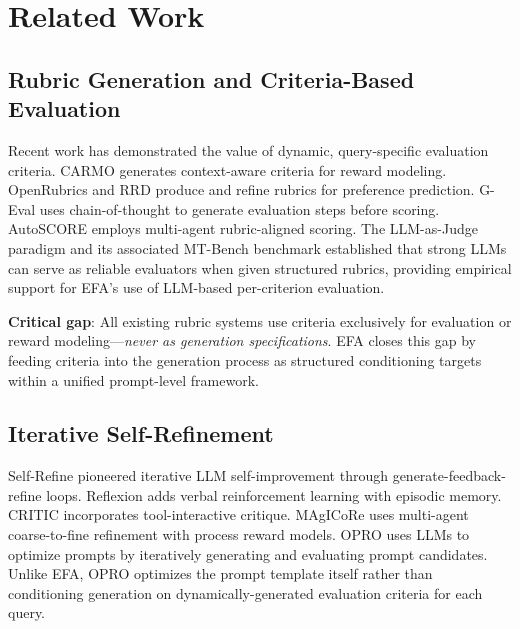 \documentclass[11pt]{article}
\newcommand{\efa}{\textsc{EFA}}  %
\begin{document}
\section{Related Work}

\subsection{Rubric Generation and Criteria-Based Evaluation}

Recent work has demonstrated the value of dynamic, query-specific evaluation criteria. CARMO \citep{zhang2025carmo} generates context-aware criteria for reward modeling. OpenRubrics \citep{li2025openrubrics} and RRD \citep{wang2026rrd} produce and refine rubrics for preference prediction. G-Eval \citep{liu2023geval} uses chain-of-thought to generate evaluation steps before scoring. AutoSCORE \citep{chen2025autoscore} employs multi-agent rubric-aligned scoring. The LLM-as-Judge paradigm \citep{zheng2023judging} and its associated MT-Bench benchmark established that strong LLMs can serve as reliable evaluators when given structured rubrics, providing empirical support for \efa{}'s use of LLM-based per-criterion evaluation.

\textbf{Critical gap}: All existing rubric systems use criteria exclusively for evaluation or reward modeling---\emph{never as generation specifications}. \efa{} closes this gap by feeding criteria into the generation process as structured conditioning targets within a unified prompt-level framework.

\subsection{Iterative Self-Refinement}

Self-Refine \citep{madaan2023selfrefine} pioneered iterative LLM self-improvement through generate-feedback-refine loops. Reflexion \citep{shinn2023reflexion} adds verbal reinforcement learning with episodic memory. CRITIC \citep{gou2024critic} incorporates tool-interactive critique. MAgICoRe \citep{chen2025magicore} uses multi-agent coarse-to-fine refinement with process reward models. OPRO \citep{yang2023large} uses LLMs to optimize prompts by iteratively generating and evaluating prompt candidates. Unlike \efa{}, OPRO optimizes the prompt template itself rather than conditioning generation on dynamically-generated evaluation criteria for each query.
\end{document}
